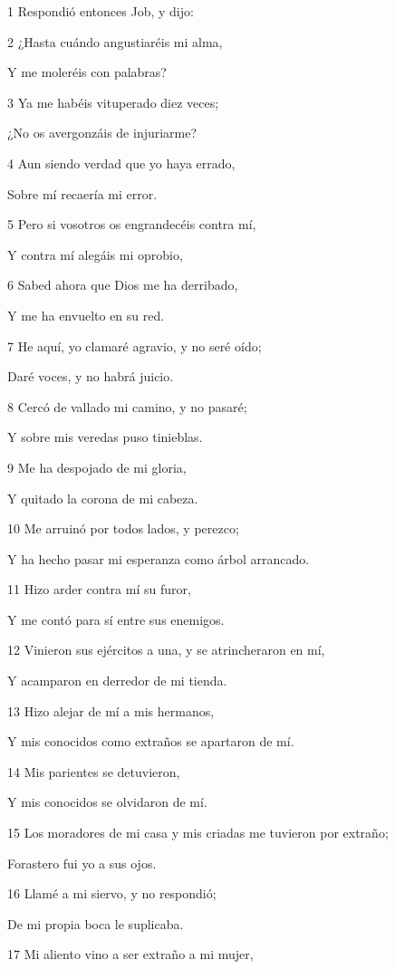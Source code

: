\par 1 Respondió entonces Job, y dijo:
\par 2 ¿Hasta cuándo angustiaréis mi alma,
\par Y me moleréis con palabras?
\par 3 Ya me habéis vituperado diez veces;
\par ¿No os avergonzáis de injuriarme?
\par 4 Aun siendo verdad que yo haya errado,
\par Sobre mí recaería mi error.
\par 5 Pero si vosotros os engrandecéis contra mí,
\par Y contra mí alegáis mi oprobio,
\par 6 Sabed ahora que Dios me ha derribado,
\par Y me ha envuelto en su red.
\par 7 He aquí, yo clamaré agravio, y no seré oído;
\par Daré voces, y no habrá juicio.
\par 8 Cercó de vallado mi camino, y no pasaré;
\par Y sobre mis veredas puso tinieblas.
\par 9 Me ha despojado de mi gloria,
\par Y quitado la corona de mi cabeza.
\par 10 Me arruinó por todos lados, y perezco;
\par Y ha hecho pasar mi esperanza como árbol arrancado.
\par 11 Hizo arder contra mí su furor,
\par Y me contó para sí entre sus enemigos.
\par 12 Vinieron sus ejércitos a una, y se atrincheraron en mí,
\par Y acamparon en derredor de mi tienda.
\par 13 Hizo alejar de mí a mis hermanos,
\par Y mis conocidos como extraños se apartaron de mí.
\par 14 Mis parientes se detuvieron,
\par Y mis conocidos se olvidaron de mí.
\par 15 Los moradores de mi casa y mis criadas me tuvieron por extraño;
\par Forastero fui yo a sus ojos.
\par 16 Llamé a mi siervo, y no respondió;
\par De mi propia boca le suplicaba.
\par 17 Mi aliento vino a ser extraño a mi mujer,
